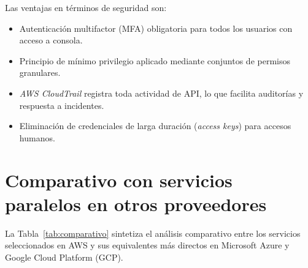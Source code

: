 \documentclass[12pt, a4paper]{article}
\begin{document}
Las ventajas en términos de seguridad son:

\begin{itemize}
  \item Autenticación multifactor (MFA) obligatoria para todos los usuarios con acceso a consola.
  \item Principio de mínimo privilegio aplicado mediante conjuntos de permisos granulares.
  \item \textit{AWS CloudTrail} registra toda actividad de API, lo que facilita auditorías y respuesta a incidentes.
  \item Eliminación de credenciales de larga duración (\textit{access keys}) para accesos humanos.
\end{itemize}

\section{Comparativo con servicios paralelos en otros proveedores}

La Tabla~\ref{tab:comparativo} sintetiza el análisis comparativo entre los servicios seleccionados en AWS y sus equivalentes más directos en Microsoft Azure y Google Cloud Platform (GCP).

\vspace{8pt}
\end{document}
